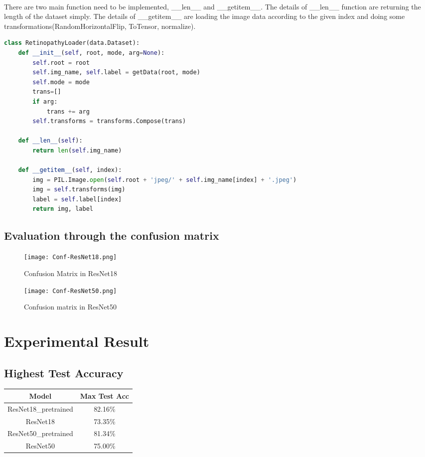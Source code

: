 \paragraph{}
There are two main function need to be implemented, \_\_len\_\_ and \_\_getitem\_\_. The details of \_\_len\_\_ function are returning the length of the dataset simply. The details of \_\_getitem\_\_ are loading the image data according to the given index and doing some transformations(RandomHorizontalFlip, ToTensor, normalize).
\begin{lstlisting}[language=Python]
class RetinopathyLoader(data.Dataset):
    def __init__(self, root, mode, arg=None):
        self.root = root
        self.img_name, self.label = getData(root, mode)
        self.mode = mode
        trans=[]
        if arg:
            trans += arg
        self.transforms = transforms.Compose(trans)

    def __len__(self):
        return len(self.img_name)

    def __getitem__(self, index):
        img = PIL.Image.open(self.root + 'jpeg/' + self.img_name[index] + '.jpeg')
        img = self.transforms(img)
        label = self.label[index]
        return img, label
\end{lstlisting}
\subsection{Evaluation through the confusion matrix}
\begin{figure}[!ht]
    \begin{center} 
        \texttt{[image: Conf-ResNet18.png]}
        \caption{Confusion Matrix in ResNet18}
    \end{center} 
\end{figure}
\begin{figure}[!ht]
    \begin{center} 
        \texttt{[image: Conf-ResNet50.png]}
        \caption{Confusion matrix in ResNet50}
    \end{center} 
\end{figure}
\section{Experimental Result}
\subsection{Highest Test Accuracy}
\begin{center}
\begin{tabular}{ |c|c|  }
\hline
Model & Max Test Acc\\
\hline
ResNet18\_pretrained & 82.16\% \\
ResNet18 & 73.35\% \\
ResNet50\_pretrained & 81.34\% \\
ResNet50 & 75.00\% \\
\hline
\end{tabular}
\end{center}
